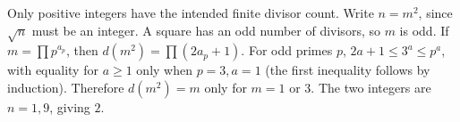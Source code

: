 Only positive integers have the intended finite divisor count. Write $n=m^2$, since $\sqrt n$ must be an integer. A square has an odd number of divisors, so $m$ is odd. If $m=\prod p^{a_p}$, then $d(m^2)=\prod(2a_p+1)$. For odd primes $p$, $2a+1\le3^a\le p^a$, with equality for $a\ge1$ only when $p=3,a=1$ (the first inequality follows by induction). Therefore $d(m^2)=m$ only for $m=1$ or 3. The two integers are $n=1,9$, giving $\boxed2$.
